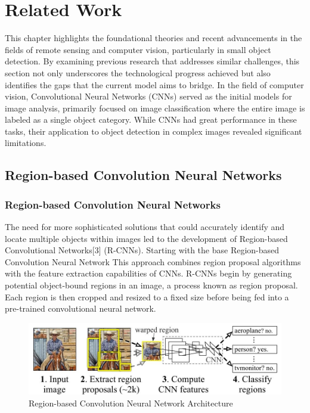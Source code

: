 \chapter{Related Work}

This chapter highlights the foundational theories and recent advancements in the fields of remote sensing and computer vision, particularly in 
small object detection. By examining previous research that addresses similar challenges, this section not only underscores the technological 
progress achieved but also identifies the gaps that the current model aims to bridge. In the field of computer vision, Convolutional Neural Networks 
(CNNs) served as the initial models for image analysis, primarily focused on image classification where the entire image is labeled as a single 
object category. While CNNs had great performance in these tasks, their application to object detection in complex images revealed significant limitations. 



\section{Region-based Convolution Neural Networks}



\subsection{Region-based Convolution Neural Networks}

The need for more sophisticated solutions that could accurately identify and locate multiple objects within images led to the development of 
Region-based Convolutional Networks[3] (R-CNNs). Starting with the base Region-based Convolution Neural Network This approach combines region proposal 
algorithms with the feature extraction capabilities of CNNs. R-CNNs begin by generating potential object-bound regions in an image, a process known 
as region proposal. Each region is then cropped and resized to a fixed size before being fed into a pre-trained convolutional neural network. 

\begin{figure}[h!]
    \centering
    \includegraphics[scale=0.45]{Figures/rcnn.jpeg}
    \caption{Region-based Convolution Neural Network Architecture}
    \label{fig:rcnn}
\end{figure}

